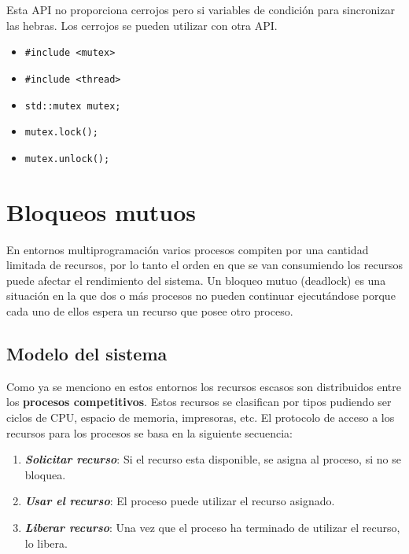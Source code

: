 \documentclass{templateNote}
\begin{document}
Esta API no proporciona cerrojos pero si variables de condición para sincronizar las hebras. Los cerrojos se pueden utilizar con otra API.

\begin{itemize}
    \item \texttt{\#include \textless{}mutex\textgreater{}}
    \item \texttt{\#include \textless{}thread\textgreater{}}
    \item \texttt{std::mutex mutex;}
    \item \texttt{mutex.lock();}
    \item \texttt{mutex.unlock();}
\end{itemize}

\newpage
\section{Bloqueos mutuos}

En entornos multiprogramación varios procesos compiten por una cantidad limitada de recursos, por lo tanto el orden en que se van consumiendo los recursos puede afectar el rendimiento del sistema. 
Un bloqueo mutuo (deadlock) es una situación en la que dos o más procesos no pueden continuar ejecutándose porque cada uno de ellos espera un recurso que posee otro proceso.


\subsection*{Modelo del sistema}
Como ya se menciono en estos entornos los recursos escasos son distribuidos entre los \textbf{procesos competitivos}. Estos recursos se clasifican por tipos pudiendo ser ciclos de CPU, espacio de memoria, impresoras, etc. El protocolo de acceso a los recursos para los procesos se basa en la siguiente secuencia:  
\begin{enumerate}
    \item \textit{\textbf{Solicitar recurso}}: Si el recurso esta disponible, se asigna al proceso, si no se bloquea.
    \item \textit{\textbf{Usar el recurso}}: El proceso puede utilizar el recurso asignado.
    \item \textit{\textbf{Liberar recurso}}: Una vez que el proceso ha terminado de utilizar el recurso, lo libera.
\end{enumerate}
\end{document}
